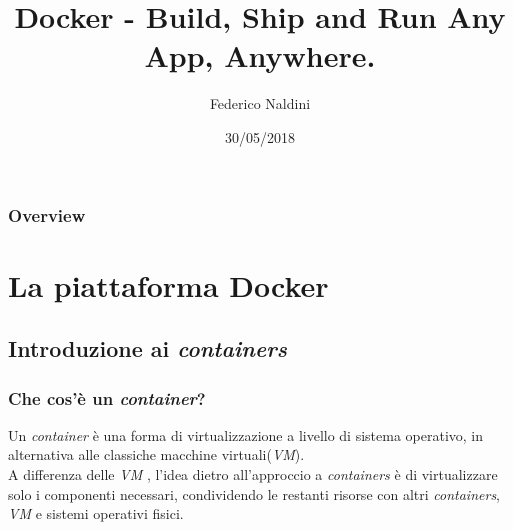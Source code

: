 \documentclass{beamer}
\title[Docker]{Docker - Build, Ship and Run Any App, Anywhere. } %
\author{Federico Naldini} %
\institute[Unibo] %
{
Alma Mater Studiorum - Università di Bologna, Cesena. \\ %
\medskip
\textit{federico.naldini3@studio.unibo.it} %
}
\date{30/05/2018} %
\begin{document}
\begin{frame}
\titlepage %
\end{frame}

\begin{frame}
\frametitle{Overview} %
\tableofcontents %
\end{frame}


\section{La piattaforma Docker} %

\subsection{Introduzione ai \textit{containers}}




\begin{frame}
\frametitle{Che cos'è un \textit{container}?}
Un \textit{container} è una forma di virtualizzazione a livello di sistema operativo, in alternativa alle classiche macchine virtuali(\textit{VM}).\\
A differenza delle \textit{VM} , l'idea dietro all'approccio a \textit{containers} è di virtualizzare solo i componenti necessari, condividendo le restanti risorse con altri \textit{containers}, \textit{VM} e sistemi operativi fisici.
\end{frame}
\end{document}
